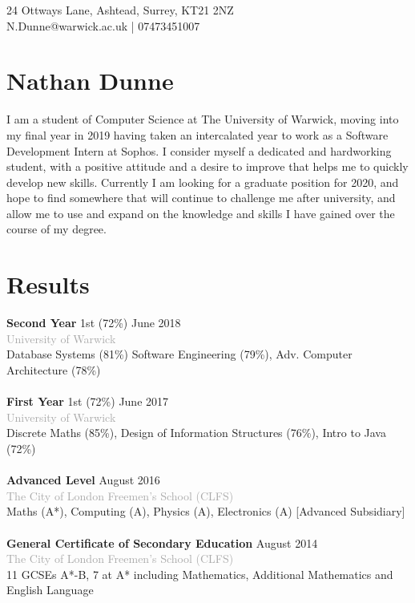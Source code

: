 \documentclass[11pt]{article}
\newcommand{\linesep}{\noindent\makebox[\linewidth]{\rule{\linewidth}{0.2pt}}}
\begin{document}
\hspace*{\fill} 24 Ottways Lane, Ashtead, Surrey, KT21 2NZ \\
\hspace*{\fill} N.Dunne@warwick.ac.uk | 07473451007
\section*{Nathan Dunne}
I am a student of Computer Science at The University of Warwick, moving into my final year in 2019 having taken an intercalated year to work as a Software Development Intern at Sophos. I consider myself a dedicated and hardworking student, with a positive attitude and a desire to improve that helps me to quickly develop new skills. Currently I am looking for a graduate position for 2020, and hope to find somewhere that will continue to challenge me after university, and allow me to use and expand on the knowledge and skills I have gained over the course of my degree.

\linesep
\section*{Results}

\textbf{Second Year} \hfill 1st (72\%) \hfill June 2018 \\
\textcolor{darkgray}{University of Warwick} \\
\hspace*{4ex}Database Systems (81\%) Software Engineering (79\%), Adv. Computer Architecture (78\%)
\\\\
\textbf{First Year} \hfill \hspace{1em} 1st (72\%) \hfill June 2017 \\    
\textcolor{darkgray}{University of Warwick} \\
\hspace*{4ex}Discrete Maths (85\%), Design of Information Structures (76\%), Intro to Java (72\%)
\\\\
\textbf{Advanced Level} \hfill August 2016 \\
\textcolor{darkgray}{The City of London Freemen’s School (CLFS)} \\                    
\hspace*{4ex}Maths (A*), Computing (A), Physics (A), Electronics (A) [Advanced Subsidiary]
\\\\
\textbf{General Certificate of Secondary Education} \hfill August 2014 \\
\textcolor{darkgray}{The City of London Freemen’s School (CLFS)} \\  
\hspace*{4ex}11 GCSEs A*-B, 7 at A* including Mathematics, Additional Mathematics and English Language
\\
 \linesep
\end{document}
